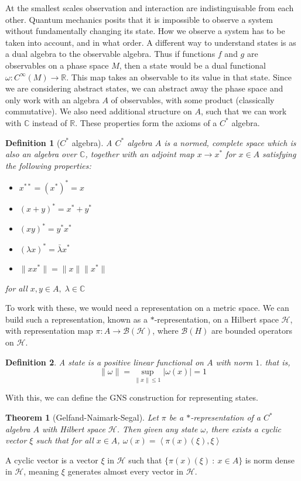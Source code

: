 \documentclass[
  12pt,
  a4paper, oneside
]{report}
\theoremstyle{bolddef}
\newtheorem{theorem}{Theorem}[chapter]
\newtheorem{definition}{Definition}
\theoremstyle{remark}
\numberwithin{equation}{chapter}
\begin{document}
At the smallest scales observation and interaction are indistinguisable from each other. Quantum mechanics posits that it is impossible to observe a system without fundamentally changing its state. How we observe a system has to be taken into account, and in what order. A different way to understand states is as a dual algebra to the observable algebra. Thus if functions $f$ and $g$ are observables on a phase space $M$, then a state would be a dual functional $\omega : C^\infty(M) \longrightarrow \mathbb{R}$. This map takes an observable to its value in that state. Since we are considering abstract states, we can abstract away the phase space and only work with an algebra $A$ of observables, with some product (classically commutative). We also need additional structure on $A$, such that we can work with $\mathbb{C}$ instead of $\mathbb{R}$. These properties form the axioms of a $C^{*}$ algebra.
\begin{definition}[$C^{*}$ algebra]
A $C^{*}$ algebra $A$ is a normed, complete space which is also an algebra over $\mathbb{C}$, together with an adjoint map $x \longrightarrow x^{*}$ for $x \in A$ satisfying the following properties: 
\begin{itemize}
\item $x^{**} = (x^{*})^{*} = x$ 
\item $(x+y)^{*} = x^{*} + y^{*}$ 
\item $(xy)^{*} = y^{*}x^{*}$ 
\item $(\lambda x)^{*} = \bar{\lambda}x^{*}$ 
\item $\|xx^{*}\| = \|x\| \|x^{*}\|$ 
\end{itemize}
for all $x, y \in A, \; \lambda \in \mathbb{C}$
\end{definition}
To work with these, we would need a representation on a metric space. We can build such a representation, known as a $*$-representation, on a Hilbert space $\mathcal{H}$, with representation map $\pi : A \longrightarrow \mathcal{B}(\mathcal{H})$, where $\mathcal{B}(H)$ are bounded operators on $\mathcal{H}$.
\begin{definition}
A \textit{state} is a positive linear functional on $A$ with norm $1$. that is, $$
\|\omega\| = \sup_{\|x\| \le 1}|\omega(x)| = 1
$$
\end{definition}
With this, we can define the GNS construction for representing states.
\begin{theorem}[Gelfand-Naimark-Segal]
Let $\pi$ be a $*$-representation of a $C^{*}$ algebra $A$ with Hilbert space $\mathcal{H}$. Then given any state $\omega$, there exists a cyclic vector $\xi$ such that for all $x \in A$, $
\omega(x) = \left\langle \pi(x)(\xi),\xi \right\rangle $
 \label{thm:GNS}
\end{theorem}
A cyclic vector is a vector $\xi$ in $\mathcal{H}$ such that $\{ \pi(x)(\xi) \: : \:x \in A\}$ is norm dense in $\mathcal{H}$, meaning $\xi$ generates almost every vector in $\mathcal{H}$. 
\end{document}
